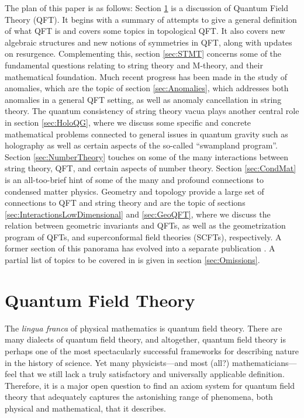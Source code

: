 \documentclass[12pt]{article}
\begin{document}
The plan of this paper  is as follows: 
Section \ref{sec:QFT} is a discussion of Quantum Field Theory (QFT). It begins with a summary of attempts to give a general definition of what QFT is and covers some topics in topological QFT. It also covers new algebraic structures
and new notions of symmetries in QFT, along with  updates on resurgence. 
Complementing this, section \ref{sec:STMT} concerns some of the fundamental questions relating to string theory and M-theory, and their mathematical foundation. Much recent progress has been made in the study of anomalies, which are the topic of section \ref{sec:Anomalies}, which  addresses both anomalies in a general QFT setting, as well as anomaly cancellation in string theory. The quantum consistency of string theory vacua plays another central role in section \ref{sec:HoloQG}, where we 
discuss some specific and concrete mathematical problems connected to general issues in quantum gravity 
such as holography as well as certain aspects of the so-called ``swampland program''. Section 
 \ref{sec:NumberTheory} touches on some of the many interactions between string theory, QFT, and certain 
 aspects of number theory. Section   \ref{sec:CondMat} is an all-too-brief hint of some of the many and 
 profound connections to condensed matter physics.
Geometry and topology provide a large set of connections to QFT and string theory and are the topic of sections \ref{sec:InteractionsLowDimensional} and  \ref{sec:GeoQFT}, where we discuss the relation between geometric invariants and QFTs, as well as the geometrization program of QFTs, and superconformal field theories (SCFTs), respectively. A former section of this panorama has evolved into a separate publication \cite{Commando}. A partial list of topics to be covered in \cite{Commando} is given in section \ref{sec:Omissions}. 




\section{Quantum Field Theory}
\label{sec:QFT}

The \emph{lingua franca} of physical mathematics is quantum field theory.
There are many dialects of quantum field theory, and altogether, 
quantum field theory is perhaps one of the most spectacularly successful frameworks for describing nature
in the history of science. Yet many physicists---and
most (all?) mathematicians---feel that we still lack a truly satisfactory and
universally applicable definition.  Therefore, it is a major open question to
find an axiom system for quantum field theory that adequately captures the
astonishing range of phenomena, both physical and mathematical, that it
describes.
\end{document}
